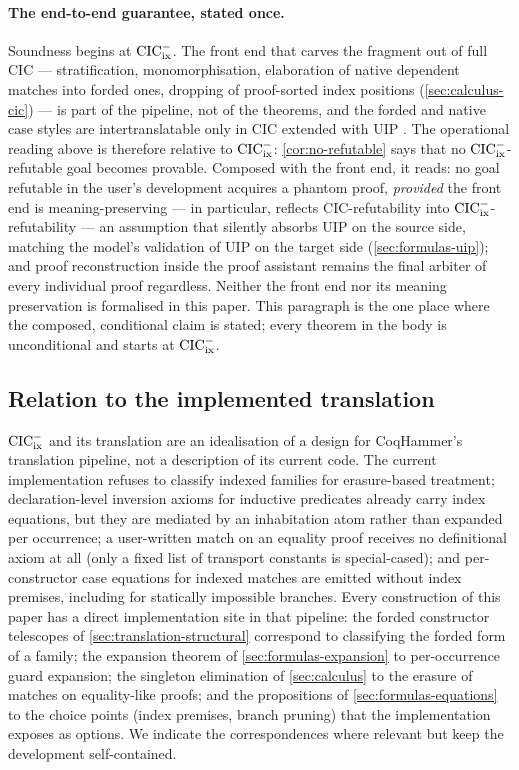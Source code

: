 \paragraph{The end-to-end guarantee, stated once.}
Soundness begins at $\mathrm{CIC}^{-}_{\mathrm{ix}}$.  The front end that carves the fragment
out of full CIC --- stratification, monomorphisation, elaboration of
native dependent matches into forded ones, dropping of proof-sorted
index positions (\cref{sec:calculus-cic}) --- is part of the pipeline,
not of the theorems, and the forded and native case styles are
intertranslatable only in CIC extended with UIP \cite{GoguenEtAl2006}.
The operational reading above is therefore relative to $\mathrm{CIC}^{-}_{\mathrm{ix}}$:
\cref{cor:no-refutable} says that no $\mathrm{CIC}^{-}_{\mathrm{ix}}$-refutable goal becomes
provable.  Composed with the front end, it reads: no goal refutable in
the user's development acquires a phantom proof, \emph{provided} the
front end is meaning-preserving --- in particular, reflects
CIC-refutability into $\mathrm{CIC}^{-}_{\mathrm{ix}}$-refutability --- an assumption that
silently absorbs UIP on the source side, matching the model's
validation of UIP on the target side (\cref{sec:formulas-uip}); and
proof reconstruction inside the proof assistant remains the final
arbiter of every individual proof regardless.  Neither the front end
nor its meaning preservation is formalised in this paper.  This
paragraph is the one place where the composed, conditional claim is
stated; every theorem in the body is unconditional and starts at
$\mathrm{CIC}^{-}_{\mathrm{ix}}$.

\subsection{Relation to the implemented translation}
\label{sec:intro-impl}

$\mathrm{CIC}^{-}_{\mathrm{ix}}$ and its translation are an idealisation of a design for
CoqHammer's translation pipeline, not a description of its current code.
The current implementation refuses to classify indexed families for
erasure-based treatment; declaration-level inversion axioms for inductive
predicates already carry index equations, but they are mediated by an
inhabitation atom rather than expanded per occurrence; a user-written
match on an equality proof receives no definitional axiom at all (only a
fixed list of transport constants is special-cased); and per-constructor
case equations for indexed matches are emitted without index premises,
including for statically impossible branches.  Every construction of this
paper has a direct implementation site in that pipeline: the forded
constructor telescopes of \cref{sec:translation-structural} correspond to
classifying the forded form of a family; the expansion theorem of
\cref{sec:formulas-expansion} to per-occurrence guard expansion; the
singleton elimination of \cref{sec:calculus} to the erasure of matches on
equality-like proofs; and the propositions of
\cref{sec:formulas-equations} to the choice points (index premises,
branch pruning) that the implementation exposes as options.  We indicate
the correspondences where relevant but keep the development
self-contained.
